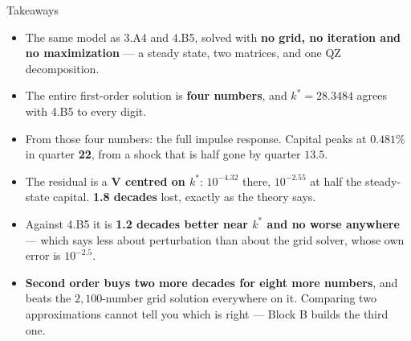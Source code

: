 \begin{frame}{Takeaways}
\begin{takeawaybox}
\begin{itemize}\small
  \item The same model as 3.A4 and 4.B5, solved with \textbf{no grid, no iteration and no maximization} --- a steady state, two matrices, and one QZ decomposition.
  \item The entire first-order solution is \textbf{four numbers}, and $k^{*}=28.3484$ agrees with 4.B5 to every digit.
  \item From those four numbers: the full impulse response. Capital peaks at $0.481\%$ in quarter \textbf{22}, from a shock that is half gone by quarter $13.5$.
  \item The residual is a \textbf{V centred on $k^{*}$}: $10^{-4.32}$ there, $10^{-2.55}$ at half the steady-state capital. \textbf{1.8 decades} lost, exactly as the theory says.
  \item Against 4.B5 it is \textbf{1.2 decades better near $k^{*}$ and no worse anywhere} --- which says less about perturbation than about the grid solver, whose own error is $10^{-2.5}$.

  \item \textbf{Second order buys two more decades for eight more numbers}, and beats the $2{,}100$-number grid solution everywhere on it. Comparing two approximations cannot tell you which is right --- Block B builds the third one.
\end{itemize}
\end{takeawaybox}
\end{frame}

